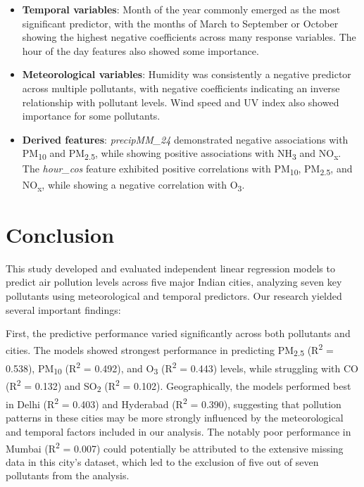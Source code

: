 \documentclass[twoside,11pt]{article}
\begin{document}
\begin{itemize}
  \item \textbf{Temporal variables}: Month of the year commonly emerged as the most significant predictor, with the months of March to September or October showing the highest negative coefficients across many response variables. The hour of the day features also showed some importance.

  \item \textbf{Meteorological variables}: Humidity was consistently a negative predictor across multiple pollutants, with negative coefficients indicating an inverse relationship with pollutant levels. Wind speed and UV index also showed importance for some pollutants.

  \item \textbf{Derived features}: \textit{precipMM\_24} demonstrated negative associations with PM\textsubscript{10} and PM\textsubscript{2.5}, while showing positive associations with NH\textsubscript{3} and NO\textsubscript{x}. The \textit{hour\_cos} feature exhibited positive correlations with PM\textsubscript{10}, PM\textsubscript{2.5}, and NO\textsubscript{x}, while showing a negative correlation with O\textsubscript{3}.
\end{itemize}

\section{Conclusion}

This study developed and evaluated independent linear regression models to predict air pollution levels across five major Indian cities, analyzing seven key pollutants using meteorological and temporal predictors. Our research yielded several important findings:

First, the predictive performance varied significantly across both pollutants and cities. The models showed strongest performance in predicting PM\textsubscript{2.5} (R\textsuperscript{2} = 0.538), PM\textsubscript{10} (R\textsuperscript{2} = 0.492), and O\textsubscript{3} (R\textsuperscript{2} = 0.443) levels, while struggling with CO (R\textsuperscript{2} = 0.132) and SO\textsubscript{2} (R\textsuperscript{2} = 0.102). Geographically, the models performed best in Delhi (R\textsuperscript{2} = 0.403) and Hyderabad (R\textsuperscript{2} = 0.390), suggesting that pollution patterns in these cities may be more strongly influenced by the meteorological and temporal factors included in our analysis. The notably poor performance in Mumbai (R\textsuperscript{2} = 0.007) could potentially be attributed to the extensive missing data in this city's dataset, which led to the exclusion of five out of seven pollutants from the analysis.
\end{document}
